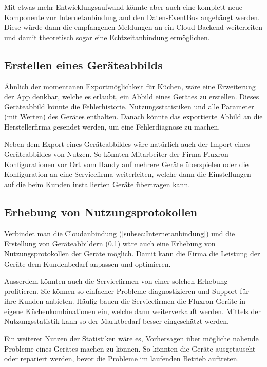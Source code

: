 Mit etwas mehr Entwicklungsaufwand könnte aber auch eine komplett neue Komponente zur Internetanbindung and den Daten-EventBus angehängt werden. Diese würde dann die empfangenen Meldungen an ein Cloud-Backend weiterleiten und damit theoretisch sogar eine Echtzeitanbindung ermöglichen.

\subsection{Erstellen eines Geräteabbilds}
\label{subsec:WeiterleitenVonFehlern}

Ähnlich der momentanen Exportmöglichkeit für Küchen, wäre eine Erweiterung der App denkbar, welche es erlaubt, ein Abbild eines Gerätes zu erstellen. Dieses Geräteabbild könnte die Fehlerhistorie, Nutzungsstatistiken und alle Parameter (mit Werten) des Gerätes enthalten. Danach könnte das exportierte Abbild an die Herstellerfirma gesendet werden, um eine Fehlerdiagnose zu machen.

Neben dem Export eines Geräteabbildes wäre natürlich auch der Import eines Geräteabbildes von Nutzen. So könnten Mitarbeiter der Firma Fluxron Konfigurationen vor Ort vom Handy auf mehrere Geräte überspielen oder die Konfiguration an eine Servicefirma weiterleiten, welche dann die Einstellungen auf die beim Kunden installierten Geräte übertragen kann.

\subsection{Erhebung von Nutzungsprotokollen}
\label{subsec:Nutzungsprotokolle}

Verbindet man die Cloudanbindung (\ref{subsec:Internetanbindung}) und die Erstellung von Geräteabbildern (\ref{subsec:WeiterleitenVonFehlern}) wäre auch eine Erhebung von Nutzungsprotokollen der Geräte möglich. Damit kann die Firma die Leistung der Geräte dem Kundenbedarf anpassen und optimieren.

Ausserdem könnten auch die Servicefirmen von einer solchen Erhebung profitieren. Sie können so einfacher Probleme diagnostizieren und Support für ihre Kunden anbieten. Häufig bauen die Servicefirmen die Fluxron-Geräte in eigene Küchenkombinationen ein, welche dann weiterverkauft werden. Mittels der Nutzungsstatistik kann so der Marktbedarf besser eingeschätzt werden.

Ein weiterer Nutzen der Statistiken wäre es, Vorhersagen über mögliche nahende Probleme eines Gerätes machen zu können. So könnten die Geräte ausgetauscht oder repariert werden, bevor die   Probleme im laufenden Betrieb auftreten.